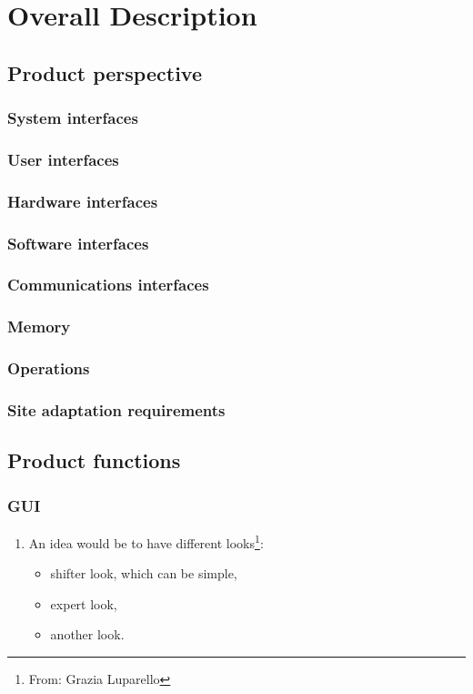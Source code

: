 \chapter{Overall Description}
\section{Product perspective}

\subsection{System interfaces}
\subsection{User interfaces}
\subsection{Hardware interfaces}
\subsection{Software interfaces}


\subsection{Communications interfaces}
\subsection{Memory}
\subsection{Operations}
\subsection{Site adaptation requirements}

\section{Product functions}
\subsection{GUI}
\begin{enumerate}
  \item An idea would be to have different looks\footnote{From: Grazia Luparello}:
  \begin{itemize}
    \item shifter look, which can be simple,
    \item expert look,
    \item another look.
  \end{itemize}
\end{enumerate}
